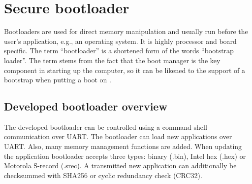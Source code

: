 \chapter{Secure bootloader} %
\label{custom_bootloader}

Bootloaders are used for direct memory manipulation and usually run before the user's application, e.g., an operating system. It is highly processor and board specific. The term “bootloader” is a shortened form of the words “bootstrap loader”. The term stems from the fact that the boot manager is the key component in starting up the computer, so it can be likened to the support of a bootstrap when putting a boot on \citep{bootloader_intro}.

\section{Developed bootloader overview}

The developed bootloader can be controlled using a command shell communication over UART. The bootloader can load new applications over UART. Also, many memory management functions are added. When updating the application bootloader accepts three types: binary (.bin), Intel hex (.hex) or Motorola S-record (.srec). A transmitted new application can additionally be checksummed with SHA256 or cyclic redundancy check (CRC32).

